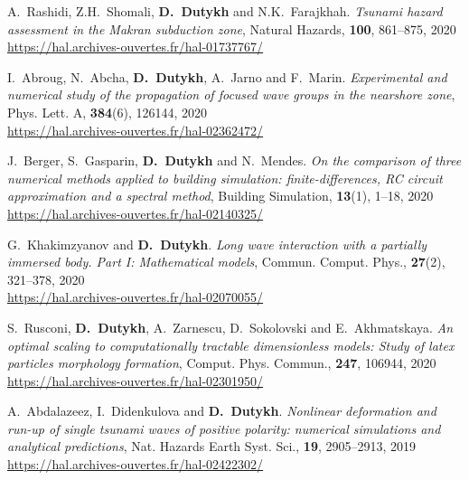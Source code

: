 \begin{etaremune}
  \item A.~Rashidi, Z.H.~Shomali, \textbf{D.~Dutykh} and N.K.~Farajkhah. \textit{Tsunami hazard assessment in the Makran subduction zone}, Natural Hazards, \textbf{100}, 861--875, 2020 \\ %
  \url{https://hal.archives-ouvertes.fr/hal-01737767/}
  
  \item I.~Abroug, N.~Abcha, \textbf{D.~Dutykh}, A.~Jarno and F.~Marin. \textit{Experimental and numerical study of the propagation of focused wave groups in the nearshore zone}, Phys. Lett. A, \textbf{384}(6), 126144, 2020 \\ %
  \url{https://hal.archives-ouvertes.fr/hal-02362472/}
  
  \item J.~Berger, S.~Gasparin, \textbf{D.~Dutykh} and N.~Mendes. \textit{On the comparison of three numerical methods applied to building simulation: finite-differences, RC circuit approximation and a spectral method}, Building Simulation, \textbf{13}(1), 1--18, 2020 \\ %
  \url{https://hal.archives-ouvertes.fr/hal-02140325/}
  
  \item G.~Khakimzyanov and \textbf{D.~Dutykh}. \textit{Long wave interaction with a partially immersed body. Part I: Mathematical models}, Commun. Comput. Phys., \textbf{27}(2), 321--378, 2020 \\ %
  \url{https://hal.archives-ouvertes.fr/hal-02070055/}
  
  \item S.~Rusconi, \textbf{D.~Dutykh}, A.~Zarnescu, D.~Sokolovski and E.~Akhmatskaya. \textit{An optimal scaling to computationally tractable dimensionless models: Study of latex particles morphology formation}, Comput. Phys. Commun., \textbf{247}, 106944, 2020 \\ %
  \url{https://hal.archives-ouvertes.fr/hal-02301950/}
  
  
  \item A.~Abdalazeez, I.~Didenkulova and \textbf{D.~Dutykh}. \textit{Nonlinear deformation and run-up of single tsunami waves of positive polarity: numerical simulations and analytical predictions}, Nat. Hazards Earth Syst. Sci., \textbf{19}, 2905--2913, 2019 \\ %
  \url{https://hal.archives-ouvertes.fr/hal-02422302/}
  

\end{etaremune}
